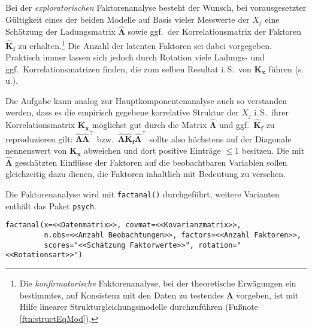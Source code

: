 Bei der \emph{exploratorischen} Faktorenanalyse besteht der Wunsch, bei vorausgesetzter Gültigkeit eines der beiden Modelle auf Basis vieler Messwerte der $X_{j}$ eine Schätzung der Ladungsmatrix $\hat{\bm{\Lambda}}$ sowie ggf.\ der Korrelationsmatrix der Faktoren $\hat{\bm{K}}_{\bm{f}}$ zu erhalten.\footnote{Die \emph{konfirmatorische} Faktorenanalyse, bei der theoretische Erwägungen ein bestimmtes, auf Konsistenz mit den Daten zu testendes $\bm{\Lambda}$ vorgeben, ist mit Hilfe linearer Strukturgleichungsmodelle durchzuführen (Fußnote \ref{ftn:structEqMod}).} Die Anzahl der latenten Faktoren sei dabei vorgegeben. Praktisch immer lassen sich jedoch durch Rotation viele Ladungs- und ggf.\ Korrelationsmatrizen finden, die zum selben Resultat i.\,S.\ von $\bm{K}_{\bm{x}}$ führen (s.\,u.).

Die Aufgabe kann analog zur Hauptkomponentenanalyse auch so verstanden werden, dass es die empirisch gegebene korrelative Struktur der $X_{j}$ i.\,S.\ ihrer Korrelationsmatrix $\bm{K}_{\bm{x}}$ möglichst gut durch die Matrix $\hat{\bm{\Lambda}}$ und ggf.\ $\hat{\bm{K}}_{\bm{f}}$ zu reproduzieren gilt: $\hat{\bm{\Lambda}} \hat{\bm{\Lambda}}^{\top}$ bzw.\ $\hat{\bm{\Lambda}} \hat{\bm{K}}_{\bm{f}} \hat{\bm{\Lambda}}^{\top}$ sollte also höchstens auf der Diagonale nennenswert von $\bm{K}_{\bm{x}}$ abweichen und dort positive Einträge $\leq 1$ besitzen. Die mit $\hat{\bm{\Lambda}}$ geschätzten Einflüsse der Faktoren auf die beobachtbaren Variablen sollen gleichzeitig dazu dienen, die Faktoren inhaltlich mit Bedeutung zu versehen.

Die Faktorenanalyse wird mit \lstinline!factanal()! durchgeführt, weitere Varianten enthält das Paket \lstinline!psych!.
\begin{lstlisting}
factanal(x=<<Datenmatrix>>, covmat=<<Kovarianzmatrix>>,
         n.obs=<<Anzahl Beobachtungen>>, factors=<<Anzahl Faktoren>>,
         scores="<<Schätzung Faktorwerte>>", rotation="<<Rotationsart>>")
\end{lstlisting}

